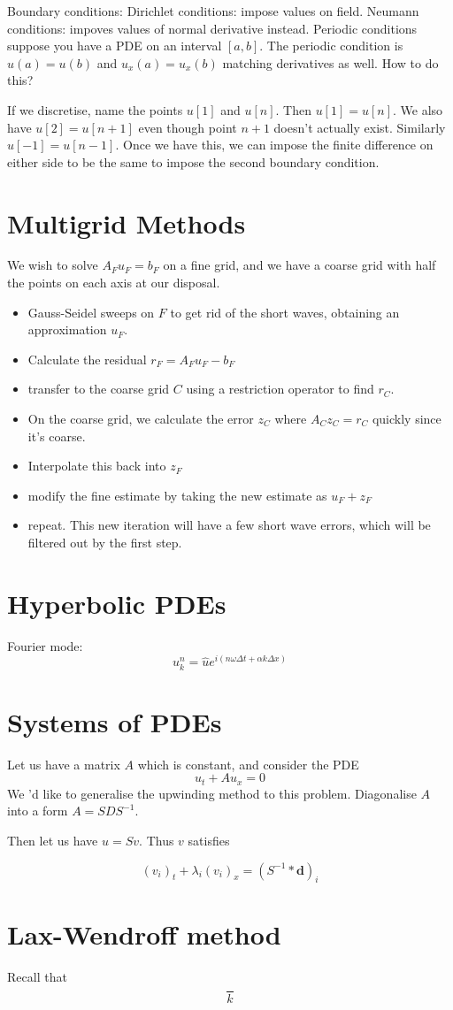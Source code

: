 \documentclass{article}
\numberwithin{equation}{section}
\theoremstyle{definition}
\begin{document}
Boundary conditions:
Dirichlet conditions: impose values on field.
Neumann conditions: impoves values of normal derivative instead.
Periodic conditions suppose you have a PDE on an interval $[a,b]$. The periodic condition is $u(a) = u(b)$ and $u_x(a) = u_x(b)$ matching derivatives as well. How to do this?

If we discretise, name the points $u[1]$ and $u[n]$. Then $u[1] = u[n]$. We also have $u[2] = u[n+1]$ even though point $n+1$ doesn't actually exist. Similarly $u[-1] = u[n-1]$.
Once we have this, we can impose the finite difference on either side to be the same to impose the second boundary condition.

\section{Multigrid Methods}
We wish to solve $A_F u_F = b_F$ on a fine grid, and we have a coarse grid with half the points on each axis at our disposal.
\begin{itemize}
    \item Gauss-Seidel sweeps on $F$ to get rid of the short waves, obtaining an approximation $u_F$.
    \item Calculate the residual $r_F = A_F u_F - b_F$
    \item transfer to the coarse grid $C$ using a restriction operator to find $r_C$.
    \item On the coarse grid, we calculate the error $z_C$ where $A_C z_C = r_C$ quickly since it's coarse.
    \item Interpolate this back into $z_F$
    \item modify the fine estimate by taking the new estimate as $u_F + z_F$
    \item repeat. This new iteration will have a few short wave errors, which will be filtered out by the first step.
\end{itemize}

\section{Hyperbolic PDEs}
Fourier mode:
\begin{equation}
    u_k^n = \hat{u} e^{i(n\omega \Delta t + \alpha k \Delta x)}
\end{equation}



\section{Systems of PDEs}
Let us have a matrix $A$ which is constant, and consider the PDE
\begin{equation}
    u_t + Au_x = 0
\end{equation}We
'd like to generalise the upwinding method to this problem. Diagonalise $A$ into a form $A = SDS^{-1}$.

Then let us have $u = Sv$. Thus $v$ satisfies

\begin{equation}
    (v_i)_t + \lambda_i (v_i)_x = (S^{-1} * \mathbf{d})_i
\end{equation}


\section{Lax-Wendroff method}
Recall that
\begin{equation}
    \frac{}{k}
\end{equation}
\end{document}

